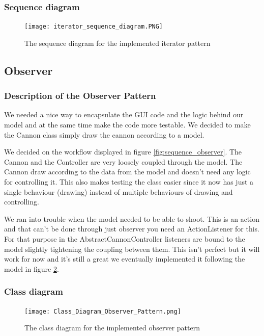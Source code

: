 \documentclass[a4paper]{article}
\begin{document}
\subsubsection{Sequence diagram}
\begin{figure}[H]
\centering
    \texttt{[image: iterator\_sequence\_diagram.PNG]}
    \caption{\label{fig:sequence_iterator} The sequence diagram for the implemented iterator pattern}
\end{figure}

\subsection{Observer}

\subsubsection{Description of the Observer Pattern}

We needed a nice way to encapsulate the GUI code and the logic behind our model and at the same time make the code more testable. We decided to make the Cannon class simply draw the cannon according to a model. 

We decided on the workflow displayed in figure  \ref{fig:sequence_observer}. The Cannon and the Controller are very loosely coupled through the model. The Cannon draw according to the data from the model and doesn’t need any logic for controlling it. This also makes testing the class easier since it now has just a single behaviour (drawing) instead of multiple behaviours of drawing and controlling. 

We ran into trouble when the model needed to be able to shoot. This is an action and that can’t be done through just observer you need an ActionListener for this. For that purpose in the AbstractCannonController listeners are bound to the model slightly tightening the coupling between them. This isn’t perfect but it will work for now and it’s still a great we eventually implemented it following the model in figure \ref{fig:class_observer}.

\subsubsection{Class diagram}
\begin{figure}[H]
    \texttt{[image: Class\_Diagram\_Observer\_Pattern.png]}
    \caption{\label{fig:class_observer} The class diagram for the implemented observer pattern}
\end{figure}
\end{document}
